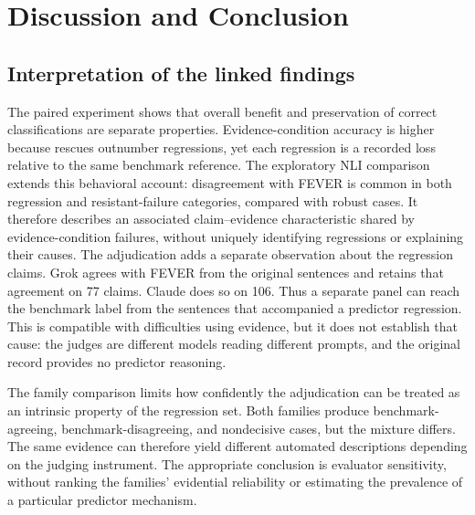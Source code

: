 \documentclass[11pt,letterpaper]{article}
\begin{document}
\section{Discussion and Conclusion}\label{sec:discussion}
\subsection{Interpretation of the linked findings}
The paired experiment shows that overall benefit and preservation of correct classifications are separate properties. Evidence-condition accuracy is higher because rescues outnumber regressions, yet each regression is a recorded loss relative to the same benchmark reference. The exploratory NLI comparison extends this behavioral account: disagreement with FEVER is common in both regression and resistant-failure categories, compared with robust cases. It therefore describes an associated claim--evidence characteristic shared by evidence-condition failures, without uniquely identifying regressions or explaining their causes. The adjudication adds a separate observation about the regression claims. Grok agrees with FEVER from the original sentences and retains that agreement on 77 claims. Claude does so on 106. Thus a separate panel can reach the benchmark label from the sentences that accompanied a predictor regression. This is compatible with difficulties using evidence, but it does not establish that cause: the judges are different models reading different prompts, and the original record provides no predictor reasoning.

The family comparison limits how confidently the adjudication can be treated as an intrinsic property of the regression set. Both families produce benchmark-agreeing, benchmark-disagreeing, and nondecisive cases, but the mixture differs. The same evidence can therefore yield different automated descriptions depending on the judging instrument. The appropriate conclusion is evaluator sensitivity, without ranking the families' evidential reliability or estimating the prevalence of a particular predictor mechanism.
\end{document}
